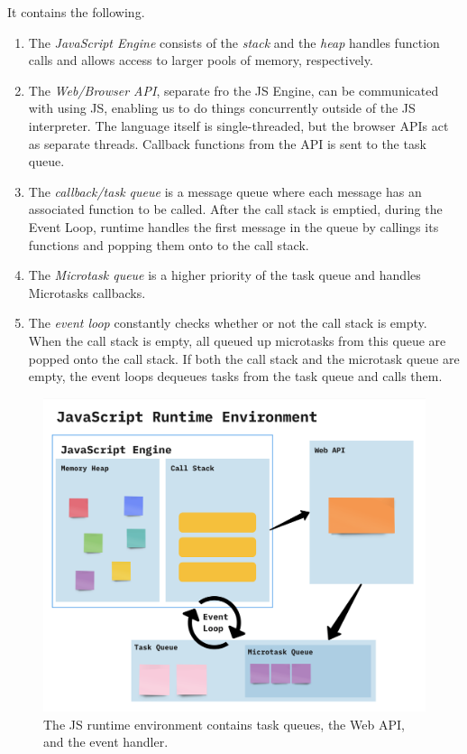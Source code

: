 \documentclass{article}
\begin{document}
  \begin{definition}
    It contains the following. 
    \begin{enumerate}
      \item The \textit{JavaScript Engine} consists of the \textit{stack} and the \textit{heap} handles function calls and allows access to larger pools of memory, respectively. 
      \item The \textit{Web/Browser API}, separate fro the JS Engine, can be communicated with using JS, enabling us to do things concurrently outside of the JS interpreter. The language itself is single-threaded, but the browser APIs act as separate threads. Callback functions from the API is sent to the task queue.   
      \item The \textit{callback/task queue} is a message queue where each message has an associated function to be called. After the call stack is emptied, during the Event Loop, runtime handles the first message in the queue by callings its functions and popping them onto to the call stack. 
      \item The \textit{Microtask queue} is a higher priority of the task queue and handles Microtasks callbacks. 
      \item The \textit{event loop} constantly checks whether or not the call stack is empty. When the call stack is empty, all queued up microtasks from this queue are popped onto the call stack. If both the call stack and the microtask queue are empty, the event loops dequeues tasks from the task queue and calls them. 
    \end{enumerate}

    \begin{figure}[H]
      \centering 
      \includegraphics[scale=0.2]{img/js_runtime_env.png}
      \caption{The JS runtime environment contains task queues, the Web API, and the event handler.} 
      \label{fig:js_runtime_env}
    \end{figure}
  \end{definition}
\end{document}

